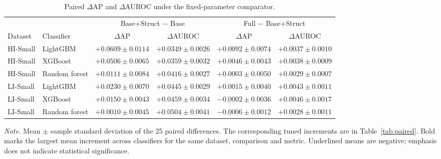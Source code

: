 \begin{table}[htbp]
\centering
\footnotesize
\caption{Paired $\Delta$AP and $\Delta$AUROC under the fixed-parameter comparator.}
\label{tab:fixed}
\setlength{\tabcolsep}{4pt}
\begin{threeparttable}
\begin{tabular}{llcccc}
\toprule
& & \multicolumn{2}{c}{Base+Struct $-$ Base} & \multicolumn{2}{c}{Full $-$ Base+Struct} \\
\cmidrule(lr){3-4}\cmidrule(lr){5-6}
Dataset & Classifier & $\Delta$AP & $\Delta$AUROC & $\Delta$AP & $\Delta$AUROC \\
\midrule
HI-Small & LightGBM & $\mathbf{+0.0609} \pm 0.0114$ & $+0.0349 \pm 0.0026$ & $\mathbf{+0.0092} \pm 0.0074$ & $+0.0037 \pm 0.0010$ \\
HI-Small & XGBoost & $+0.0506 \pm 0.0065$ & $+0.0359 \pm 0.0032$ & $+0.0046 \pm 0.0043$ & $\mathbf{+0.0038} \pm 0.0009$ \\
HI-Small & Random forest & $+0.0111 \pm 0.0084$ & $\mathbf{+0.0416} \pm 0.0027$ & $+0.0003 \pm 0.0050$ & $+0.0029 \pm 0.0007$ \\
\addlinespace
LI-Small & LightGBM & $\mathbf{+0.0230} \pm 0.0070$ & $+0.0445 \pm 0.0029$ & $\mathbf{+0.0015} \pm 0.0040$ & $+0.0043 \pm 0.0011$ \\
LI-Small & XGBoost & $+0.0150 \pm 0.0043$ & $+0.0459 \pm 0.0034$ & $\underline{-0.0002} \pm 0.0036$ & $\mathbf{+0.0046} \pm 0.0017$ \\
LI-Small & Random forest & $+0.0010 \pm 0.0045$ & $\mathbf{+0.0504} \pm 0.0041$ & $\underline{-0.0006} \pm 0.0012$ & $+0.0028 \pm 0.0011$ \\
\bottomrule
\end{tabular}
\begin{tablenotes}[flushleft]
\footnotesize
\setlength{\labelsep}{0pt}\item[] \textit{Note.} Mean $\pm$ sample standard deviation of the 25 paired differences. The corresponding tuned increments are in Table~\ref{tab:paired}. Bold marks the largest mean increment across classifiers for the same dataset, comparison and metric. Underlined means are negative; emphasis does not indicate statistical significance.
\end{tablenotes}
\end{threeparttable}
\end{table}
